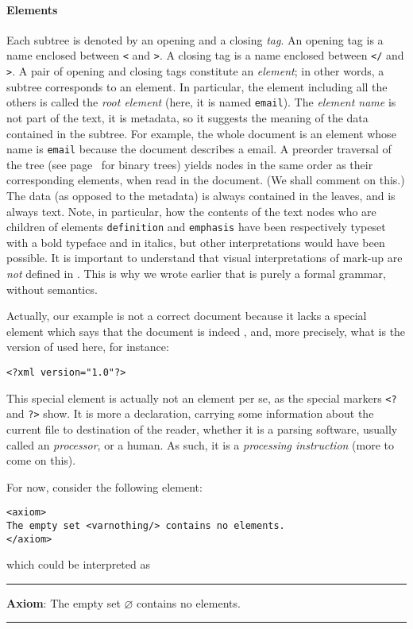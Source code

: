 \paragraph{Elements}

Each subtree is denoted by an opening and a closing \emph{tag}. An
opening tag is a name enclosed between \texttt{<} and \texttt{>}. A
closing tag is a name enclosed between \texttt{</} and \texttt{>}. A
pair of opening and closing tags constitute an \emph{element}; in
other words, a subtree corresponds to an element. In particular, the
element including all the others is called the \emph{root element}
(here, it is named \texttt{email}). The \emph{element name} is not
part of the text, it is metadata, so it suggests the meaning of the
data contained in the subtree. For example, the whole \XML document is
an element whose name is \texttt{email} because the document describes
a email. A preorder traversal of the \XML tree (see
page~\pageref{preorder} for binary trees) yields nodes in the same
order as their corresponding elements, when read in the \XML
document. (We shall comment on this.) The data (as opposed to the
metadata) is always contained in the leaves, and is always text. Note,
in particular, how the contents of the text nodes who are children of
elements \texttt{definition} and \texttt{emphasis} have been
respectively typeset with a bold typeface and in italics, but other
interpretations would have been possible. It is important to
understand that visual interpretations of mark\hyp{}up are \emph{not}
defined in \XML. This is why we wrote earlier that \XML is purely a
formal grammar, without semantics.

Actually, our example is not a correct \XML document because it lacks
a special element which says that the document is indeed \XML, and,
more precisely, what is the version of \XML used here, for instance:
\begin{verbatim}
<?xml version="1.0"?>
\end{verbatim}
This special element is actually not an element per se, as the special
markers \texttt{<?} and \texttt{?>} show. It is more a declaration,
carrying some information about the current file to destination of the
reader, whether it is a parsing software, usually called an \emph{\XML
  processor}, or a human. As such, it is a \emph{processing
  instruction} (more to come on this).

For now, consider the following element:
\begin{verbatim}
<axiom>
The empty set <varnothing/> contains no elements.
</axiom>
\end{verbatim}
which could be interpreted as\\
\noindent\rule{\linewidth}{0.5pt}
\textsf{
\textbf{Axiom}: The empty set \(\varnothing\) contains no elements.}\\
\noindent\rule{\linewidth}{0.5pt}

